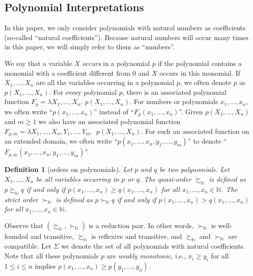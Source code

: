\documentclass[envcountsame]{tlp}
\newcounter{ex:der-lastsymconsctr}
\newtheorem{definition}{Definition}
\begin{document}
\subsection{Polynomial Interpretations}
\label{poly_interpretation}



In this paper, we only consider polynomials with natural numbers as
coefficients (so-called ``natural coefficients'').
Because natural numbers will occur many times in this paper, we will 
simply refer to them as ``numbers''.

We say that a variable $X$ \emph{occurs} in a polynomial $p$ if the polynomial
contains a monomial with a coefficient different from 0 and $X$ occurs in
this monomial.
If $X_1,\ldots,X_n$ are all the variables occurring in a polynomial $p$, we often
denote $p$ as $p(X_1,\ldots,X_n)$. For every polynomial $p$,
there is an associated polynomial function $F_p = \lambda X_1,\ldots,X_n.$ $p(X_1,\ldots,X_n)$.
For numbers or polynomials $x_1,\ldots,x_n$, we often write
``$p(x_1,\ldots,x_n)$''
instead of ``$F_p(x_1,\ldots,x_n)$''.
Given $p(X_1,\ldots,X_n)$ and $m \geq 1$ we also have 
an associated polynomial function $F_{p,m} = \lambda
X_1,\ldots,X_n,Y_1,\ldots,Y_m.$ $\ p(X_1,\ldots,X_n)$. For such 
an associated function on an extended domain, we often write 
``$p(x_1,\ldots,x_n,y_1,\ldots,y_m)$'' to denote 
``$F_{p,m}(x_1,\ldots,x_n,y_1,\ldots,y_m)$''.








\begin{definition}[orders on polynomials]
\label{ordersonnaturals}
Let $p$ and $q$ be two polynomials.
Let $X_1,\ldots,X_n$ be all variables occurring
in $p$ or $q$. The quasi-order
$\succsim_{\mathbb{N}}$  is defined as
$p \succsim_{\mathbb{N}} q$ if and only if $p(x_1,\ldots,x_n) \ge q(x_1,\ldots,x_n)$ for
all $x_1,\ldots,x_n \in \mathbb{N}$.
The strict order $\succ_{\mathbb{N}}$
is defined as $p \succ_{\mathbb{N}} q$ if and only
if  $p(x_1,\ldots,x_n) > q(x_1,\ldots,x_n)$ for
all $x_1,\ldots,x_n \in \mathbb{N}$.
\end{definition}










Observe that $(\succsim_{\mathbb{N}}, \succ_{\mathbb{N}})$ is a reduction pair.
In other words, 
$\succ_{\mathbb{N}}$ is well-founded and transitive,
$\succsim_{\mathbb{N}}$ is reflexive and transitive, and $\succsim_{\mathbb{N}}$ and 
$\succ_{\mathbb{N}}$ are compatible.
Let $\mathit{\Sigma}$ we denote the set of all polynomials with natural
coefficients.  Note that all these polynomials $p$ are \emph{weakly
monotonic}, i.e., $x_i \ge y_i$ for all $1 \leq i \leq n$ implies
$p(x_1,\ldots,x_n) \ge p(y_1,\ldots,y_n)$.
\end{document}
